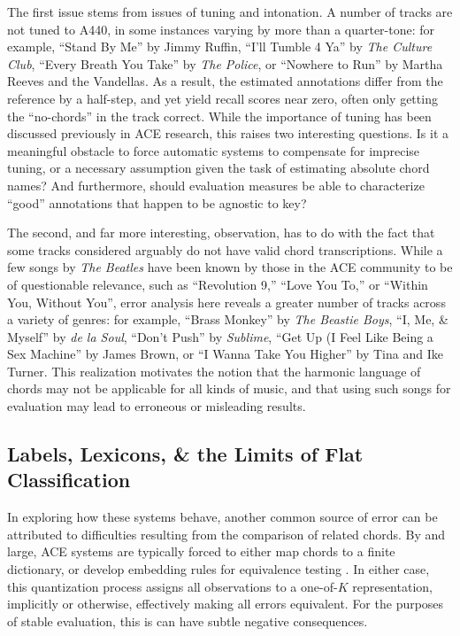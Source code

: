 \documentclass{article}
\begin{document}
The first issue stems from issues of tuning and intonation.
A number of tracks are not tuned to A440, in some instances varying by more than a quarter-tone:
for example, ``Stand By Me'' by Jimmy Ruffin, ``I'll Tumble 4 Ya'' by \emph{The Culture Club}, ``Every Breath You Take'' by \emph{The Police}, or ``Nowhere to Run'' by Martha Reeves and the Vandellas.
As a result, the estimated annotations differ from the reference by a half-step, and yet yield recall scores near zero, often only getting the ``no-chords'' in the track correct.
While the importance of tuning has been discussed previously in ACE research, this raises two interesting questions.
Is it a meaningful obstacle to force automatic systems to compensate for imprecise tuning, or a necessary assumption given the task of estimating absolute chord names?
And furthermore, should evaluation measures be able to characterize ``good'' annotations that happen to be agnostic to key?

The second, and far more interesting, observation, has to do with the fact that some tracks considered arguably do not have valid chord transcriptions.
While a few songs by \emph{The Beatles} have been known by those in the ACE community to be of questionable relevance, such as ``Revolution 9,'' ``Love You To,'' or ``Within You, Without You'', error analysis here reveals a greater number of tracks across a variety of genres:
for example, ``Brass Monkey'' by \emph{The Beastie Boys}, ``I, Me, \& Myself'' by \emph{de la Soul}, ``Don't Push'' by \emph{Sublime}, ``Get Up (I Feel Like Being a Sex Machine'' by James Brown, or ``I Wanna Take You Higher'' by Tina and Ike Turner.
This realization motivates the notion that the harmonic language of chords may not be applicable for all kinds of music, and that using such songs for evaluation may lead to erroneous or misleading results.


\subsection{Labels, Lexicons, \& the Limits of Flat Classification}

In exploring how these systems behave, another common source of error can be attributed to difficulties resulting from the comparison of related chords.
By and large, ACE systems are typically forced to either map chords to a finite dictionary, or develop embedding rules for equivalence testing \cite{Raffel2014MIREval}.
In either case, this quantization process assigns all observations to a one-of-$K$ representation, implicitly or otherwise, effectively making all errors equivalent.
For the purposes of stable evaluation, this is can have subtle negative consequences.
\end{document}
